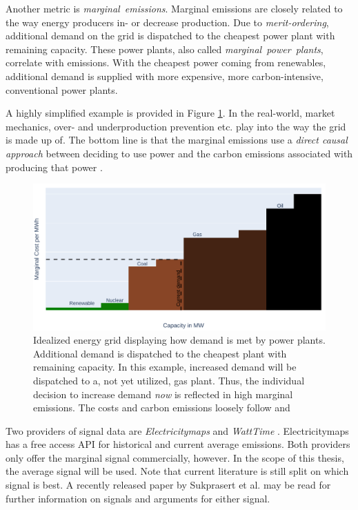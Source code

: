 Another metric is \emph{marginal~emissions}. 
Marginal emissions are closely related to the way energy producers in- or decrease production.
Due to \emph{merit-ordering}, additional demand on the grid is dispatched to the cheapest power plant with remaining capacity.
These power plants, also called \emph{marginal~power~plants}, correlate with emissions. 
With the cheapest power coming from renewables, additional demand is supplied with more expensive, more carbon-intensive, conventional power plants.

A highly simplified example is provided in Figure \ref{fig:marginal_example}.
In the real-world, market mechanics, over- and underproduction prevention etc. play into the way the grid is made up of.
The bottom line is that the marginal emissions use a \emph{direct causal approach} between deciding to use power and the carbon emissions associated with producing that power . 

\begin{figure}
    \includegraphics[width=\linewidth]{notebooks/marginal_emissions.pdf}
    \caption[short]{
        Idealized energy grid displaying how demand is met by power plants. 
        Additional demand is dispatched to the cheapest plant with remaining capacity. 
        In this example, increased demand will be dispatched to a, not yet utilized, gas plant.
        Thus, the individual decision to increase demand \emph{now} is reflected in high marginal emissions.
        The costs and carbon emissions loosely follow  and  
        }
    \label{fig:marginal_example}
\end{figure}

Two providers of signal data are \emph{Electricitymaps}  and \emph{WattTime} .
Electricitymaps has a free access API for historical and current average emissions. Both providers only offer the marginal signal commercially, however. 
In the scope of this thesis, the average signal will be used. 
Note that current literature is still split on which signal is best. 
A recently released paper by Sukprasert et al. \cite{sukprasert_limitations_2024} may be read for further information on signals and arguments for either signal.

